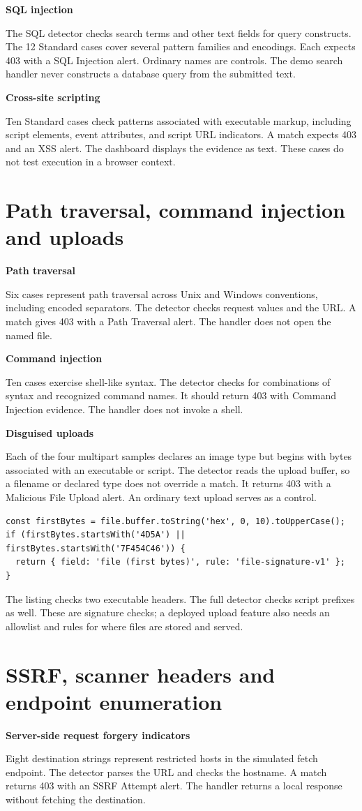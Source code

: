 \documentclass[11pt,a4paper,oneside]{report}
\newcommand{\topic}[1]{\par\addvspace{4pt}\noindent\textbf{#1}\par\nobreak\vspace{-.20em}}
\newcommand{\sheet}[1]{\clearpage\section{#1}}
\begin{document}
\topic{SQL injection}
The SQL detector checks search terms and other text fields for query constructs. The 12 Standard cases cover several pattern families and encodings. Each expects 403 with a SQL Injection alert. Ordinary names are controls. The demo search handler never constructs a database query from the submitted text.

\topic{Cross-site scripting}
Ten Standard cases check patterns associated with executable markup, including script elements, event attributes, and script URL indicators. A match expects 403 and an XSS alert. The dashboard displays the evidence as text. These cases do not test execution in a browser context.

\sheet{Path traversal, command injection and uploads}
\topic{Path traversal}
Six cases represent path traversal across Unix and Windows conventions, including encoded separators. The detector checks request values and the URL. A match gives 403 with a Path Traversal alert. The handler does not open the named file.

\topic{Command injection}
Ten cases exercise shell-like syntax. The detector checks for combinations of syntax and recognized command names. It should return 403 with Command Injection evidence. The handler does not invoke a shell.

\topic{Disguised uploads}
Each of the four multipart samples declares an image type but begins with bytes associated with an executable or script. The detector reads the upload buffer, so a filename or declared type does not override a match. It returns 403 with a Malicious File Upload alert. An ordinary text upload serves as a control.

\begin{lstlisting}[caption={Illustrative leading-byte gate based on the upload detector}]
const firstBytes = file.buffer.toString('hex', 0, 10).toUpperCase();
if (firstBytes.startsWith('4D5A') || firstBytes.startsWith('7F454C46')) {
  return { field: 'file (first bytes)', rule: 'file-signature-v1' };
}
\end{lstlisting}

The listing checks two executable headers. The full detector checks script prefixes as well. These are signature checks; a deployed upload feature also needs an allowlist and rules for where files are stored and served.

\sheet{SSRF, scanner headers and endpoint enumeration}
\topic{Server-side request forgery indicators}
Eight destination strings represent restricted hosts in the simulated fetch endpoint. The detector parses the URL and checks the hostname. A match returns 403 with an SSRF Attempt alert. The handler returns a local response without fetching the destination.
\end{document}
